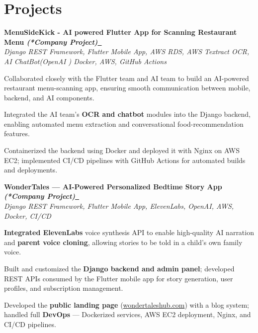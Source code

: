 \documentclass[letterpaper,10pt]{article}
\let\hrefWithoutArrow\href
\newcommand{\hrefWithArrow}[2]{\hrefWithoutArrow{#1}{#2\ \raisebox{.15ex}{\footnotesize $\to$}}}
\newcommand{\heading}[2]{
  \hspace{10pt}#1\hfill#2\\
}
\newcommand{\headingBf}[2]{
  \heading{\textbf{#1}}{\textbf{#2}}
}
\newcommand{\headingIt}[2]{
  \heading{\textit{#1}}{\textit{#2}}
}
\newenvironment{resume_list}{
  \vspace{-7pt}
  \begin{itemize}[itemsep=-2px, parsep=1pt, leftmargin=30pt]
}{
  \end{itemize}
}
\begin{document}
\section{Projects}


\headingBf{MenuSideKick - AI powered Flutter App for Scanning Restaurant Menu \textit{(*Company Project)}}{\textcolor[HTML]{336e55}{\hrefWithArrow{https://youtu.be/n9q7Y8c4iBc?si=c1xwt5natHajaPXt}{\textbullet{Project Video}}}}

\headingIt{Django REST Framework, Flutter Mobile App, AWS RDS, AWS Textract OCR, AI ChatBot(OpenAI
) Docker, AWS, GitHub Actions}{}
\begin{resume_list}
    \item Collaborated closely with the Flutter team and AI team to build an AI-powered restaurant menu-scanning app, ensuring smooth communication between mobile, backend, and AI components.
    \item Integrated the AI team’s \textbf{OCR and chatbot} modules into the Django backend, enabling automated menu extraction and conversational food-recommendation features.
    \item Containerized the backend using Docker and deployed it with Nginx on AWS EC2; implemented CI/CD pipelines with GitHub Actions for automated builds and deployments.
\end{resume_list}

\headingBf{WonderTales — AI-Powered Personalized Bedtime Story App \textit{(*Company Project)}}{\textcolor[HTML]{336e55}{\hrefWithArrow{https://wondertaleshub.com/}{\textbullet{Live Site}}}}

\headingIt{Django REST Framework, Flutter Mobile App, ElevenLabs, OpenAI, AWS, Docker, CI/CD}{}
\begin{resume_list}
    \item \textbf{Integrated ElevenLabs} voice synthesis API to enable high-quality AI narration and \textbf{parent voice cloning}, allowing stories to be told in a child's own family voice.
    \item Built and customized the \textbf{Django backend and admin panel}; developed REST APIs consumed by the Flutter mobile app for story generation, user profiles, and subscription management.
    \item Developed the \textbf{public landing page} (\href{https://wondertaleshub.com/}{wondertaleshub.com}) with a blog system; handled full \textbf{DevOps} — Dockerized services, AWS EC2 deployment, Nginx, and CI/CD pipelines.
\end{resume_list}
\end{document}
